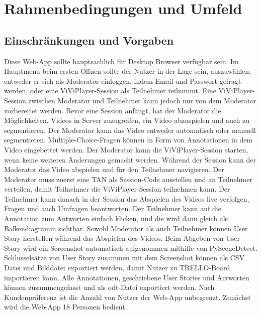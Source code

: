 \section{Rahmenbedingungen und Umfeld}

\subsection{Einschränkungen und Vorgaben}
Diese Web-App sollte hauptsachlich für Desktop Browser verfügbar sein. Im Hauptmenu beim ersten Öffnen sollte der Nutzer in der Lage sein, auszuwählen, entweder er sich als Moderator einloggen, indem Email und Passwort gefragt werden, oder eine ViViPlayer-Session als Teilnehmer teilnimmt. Eine ViViPlayer-Session zwischen Moderator und Teilnehmer kann jedoch nur von dem Moderator vorbereitet werden.\linebreak
\linebreak
Bevor eine Session anfängt, hat der Moderator die Möglichkeiten, Videos in Server zuzugreifen, ein Video abzuspielen und auch zu segmentieren. Der Moderator kann 
das Video entweder automatisch oder manuell segmentieren. Multiple-Choice-Fragen können in Form von Annotationen in dem Video eingebettet werden. Der Moderator kann die ViViPlayer-Session starten, wenn keine weiteren Änderungen gemacht werden.\linebreak
\linebreak
Während der Session kann der Moderator das Video abspielen und für den Teilnehmer navigieren. Der Moderator muss zuerst eine TAN als Session-Code ausstellen und an Teilnehmer verteilen, damit Teilnehmer die ViViPlayer-Session teilnehmen kann. Der Teilnehmer kann danach in der Session das Abspielen des Videos live verfolgen, Fragen und auch Umfragen beantworten. Der Teilnehmer kann auf die Annotation zum Antworten einfach klicken, und die wird dann gleich als Balkendiagramm sichtbar. 
Sowohl Moderator als auch Teilnehmer können User Story herstellen während das Abspielen des Videos. Beim Abgeben von User Story wird ein Screenshot automatisch aufgenommen mithilfe von PySceneDetect. Schlusselsätze von User Story zusammen mit dem Screenshot können als CSV Datei und Bilddatei exportiert werden, damit Nutzer zu TRELLO-Board importieren kann. 
Alle Annotationen, geschriebene User Stories und Antworten können zusammengefasst und als odt-Datei exportiert werden.\linebreak
\linebreak
Nach Kundenpräferenz ist die Anzahl von Nutzer der Web-App unbegrenzt. Zunächst wird die Web-App 18 Personen bedient.

